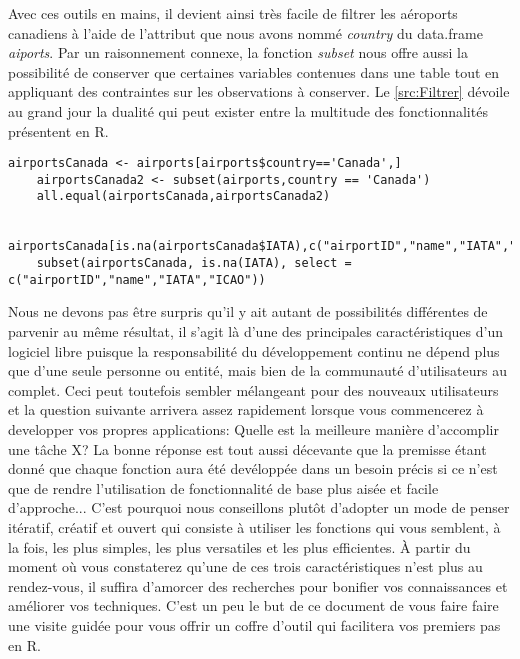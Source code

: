 \noindent
Avec ces outils en mains, il devient ainsi très facile de filtrer les aéroports canadiens à l'aide de l'attribut que nous avons nommé \emph{country} du data.frame \emph{aiports}. Par un raisonnement connexe, la fonction \emph{subset} nous offre aussi la possibilité de conserver que certaines variables contenues dans une table tout en appliquant des contraintes sur les observations à conserver. Le \autoref{src:Filtrer} dévoile au grand jour la dualité qui peut exister entre la multitude des fonctionnalités présentent en R. \\

\begin{lstlisting}[caption = Filtrer les données,label=src:Filter]
	airportsCanada <- airports[airports$country=='Canada',]
	airportsCanada2 <- subset(airports,country == 'Canada')
	all.equal(airportsCanada,airportsCanada2)

	airportsCanada[is.na(airportsCanada$IATA),c("airportID","name","IATA","ICAO")]
	subset(airportsCanada, is.na(IATA), select = c("airportID","name","IATA","ICAO"))
\end{lstlisting}

\vspace{\baselineskip}
\noindent
Nous ne devons pas être surpris qu'il y ait autant de possibilités différentes de parvenir au même résultat, il s'agit là d'une des principales caractéristiques d'un logiciel libre puisque la responsabilité du développement continu ne dépend plus que d'une seule personne ou entité, mais bien de la communauté d'utilisateurs au complet. Ceci peut toutefois sembler mélangeant pour des nouveaux utilisateurs et la question suivante arrivera assez rapidement lorsque vous commencerez à developper vos propres applications: Quelle est la meilleure manière d'accomplir une tâche X? La bonne réponse est tout aussi décevante que la premisse étant donné que chaque fonction aura été devéloppée dans un besoin précis si ce n'est que de rendre l'utilisation de fonctionnalité de base plus aisée et facile d'approche... C'est pourquoi nous conseillons plutôt d'adopter un mode de penser itératif, créatif et ouvert qui consiste à utiliser les fonctions qui vous semblent, à la fois, les plus simples, les plus versatiles et les plus efficientes. À partir du moment où vous constaterez qu'une de ces trois caractéristiques n'est plus au rendez-vous, il suffira d'amorcer des recherches pour bonifier vos connaissances et améliorer vos techniques. C'est un peu le but de ce document de vous faire faire une visite guidée pour vous offrir un coffre d'outil qui facilitera vos premiers pas en R. \\

